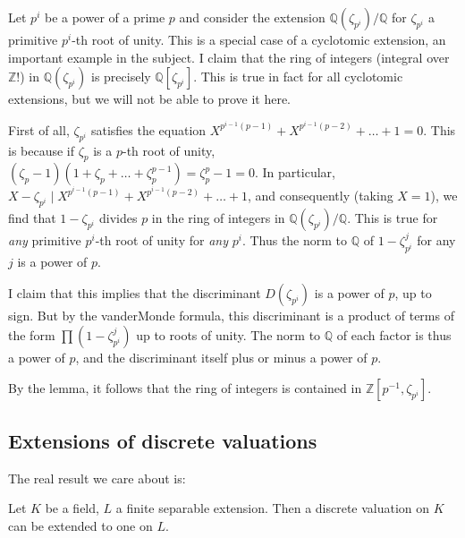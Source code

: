 \begin{example} Let $p^i$ be a power of a prime $p$ and consider the extension
$\mathbb{Q}(\zeta_{p^i})/\mathbb{Q}$ for $\zeta_{p^i}$ a primitive $p^i$-th
root of unity.  This is a special case of a cyclotomic extension, an important
example in the subject.  I claim that the ring of integers (integral over
$\mathbb{Z}$!)
in $\mathbb{Q}(\zeta_{p^i})$ is precisely $\mathbb{Q}[\zeta_{p^i}]$.  This is true in fact for all cyclotomic extensions, but we will not be able to prove it here.

First of all, $\zeta_{p^i}$ satisfies the equation $X^{p^{i-1}(p-1)} +
X^{p^{i-1}(p-2)} + \dots + 1 = 0$.  This is because if $\zeta_p$ is a $p$-th
root of unity, $(\zeta_p-1)(1+\zeta_p + \dots + \zeta_p^{p-1}) = \zeta_p^p - 1 =
0$.  In particular, $X - \zeta_{p^i} \mid X^{p^{i-1}(p-1)} +
X^{p^{i-1}(p-2)} + \dots + 1 $, and consequently (taking $X=1$), we find that
$1 - \zeta_{p^i}$ divides $p$ in the ring of integers in
$\mathbb{Q}(\zeta_{p^i})/\mathbb{Q}$.  This is true for \emph{any} primitive
$p^i$-th root of unity for \emph{any} $p^i$.  Thus the norm to $\mathbb{Q}$ of $1 - \zeta_{p^i}^j$ for any $j$ is a power of $p$.

I claim that this implies that the discriminant $D(\zeta_{p^i})$ is a power of
$p$, up to sign. But by the vanderMonde formula, this discriminant is a
product of terms of the form $\prod (1 - \zeta_{p^i}^{j})$ up to roots of
unity.  The norm to $\mathbb{Q}$ of each factor is thus a power of $p$, and the discriminant itself plus or minus a power of $p$.

By the lemma, it follows that the ring of integers is contained in
$\mathbb{Z}[p^{-1}, \zeta_{p^i}]$. 
\end{example}


\subsection{Extensions of discrete valuations}

The real result we care about is:

\begin{theorem} 
Let $K$ be a field, $L$ a finite separable extension.  Then a discrete valuation on $K$ can be extended to one on $L$.
\end{theorem}

